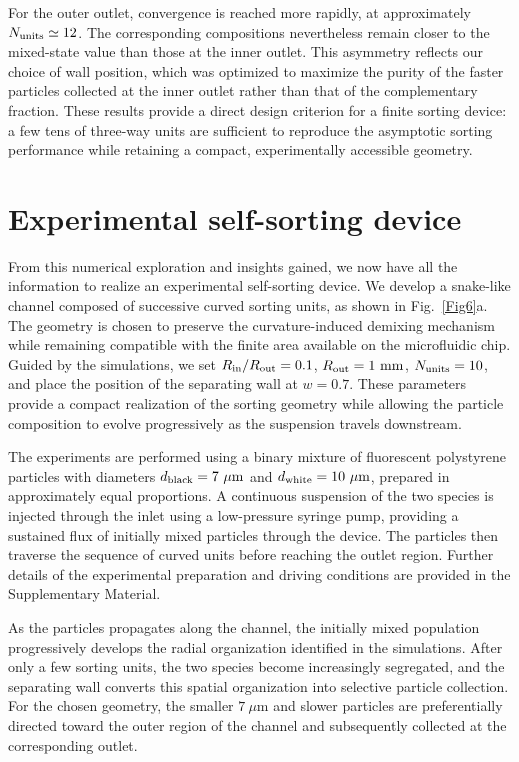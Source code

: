 \documentclass[aps,pre,twocolumn,amsmath,amssymb,notitlepage,superscriptaddress,longbibliography,nofootinbib,10pt]{revtex4-1}
\begin{document}
For the outer outlet, convergence is reached more rapidly, at approximately $N_{\rm units}\simeq12$. The corresponding compositions nevertheless remain closer to the mixed-state value than those at the inner outlet. This asymmetry reflects our choice of wall position, which was optimized to maximize the purity of the faster particles collected at the inner outlet rather than that of the complementary fraction. These results provide a direct design criterion for a finite sorting device: a few tens of three-way units are sufficient to reproduce the asymptotic sorting performance while retaining a compact, experimentally accessible geometry.
\section{Experimental self-sorting device}
\label{sec:experiment_device}
From this numerical exploration and insights gained, we now have all the information to realize an experimental self-sorting device. We develop a snake-like channel composed of successive curved sorting units, as shown in Fig.~\ref{Fig6}a. The geometry is chosen to preserve the curvature-induced demixing mechanism while remaining compatible with the finite area available on the microfluidic chip. Guided by the simulations, we set $R_{\rm in}/R_{\rm out}=0.1$, $R_{\rm out}=1~\mathrm{mm}$, $N_{\rm units}=10$, and place the
position of the separating wall at $w=0.7$. These parameters provide a compact realization of the sorting geometry while allowing the particle composition to evolve progressively as the suspension travels downstream.

The experiments are performed using a binary mixture of fluorescent polystyrene particles with diameters $d_{\rm black}=7~\mu\mathrm{m}$ and $d_{\rm white}=10~\mu\mathrm{m}$, prepared in approximately equal proportions. A continuous suspension of the two species is injected through the inlet using a low-pressure syringe pump, providing a sustained flux of initially mixed particles through the device. The particles then traverse the sequence of curved units before reaching the outlet region. Further details of the experimental preparation and driving conditions are provided in the Supplementary Material.

As the particles propagates along the channel, the initially mixed population progressively develops the radial organization identified in the simulations. After only a few sorting units, the two species become increasingly segregated, and the separating wall converts this spatial organization into selective particle collection. For the chosen geometry, the smaller $7~\mu\mathrm{m}$ and slower particles are preferentially directed toward the outer region of the channel and subsequently collected at the corresponding outlet.
\end{document}
